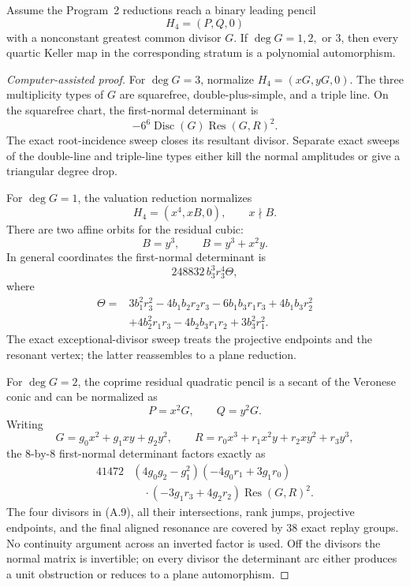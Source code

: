 \begin{theorem}
\label{thm:quartic-binary-fixed-factors}
Assume the Program~2 reductions reach a binary leading pencil
\[
 H_4=(P,Q,0)
\]
with a nonconstant greatest common divisor \(G\).  If
\(\deg G=1,2,\) or \(3\), then every quartic Keller map in the corresponding
stratum is a polynomial automorphism.
\end{theorem}

\begin{proof}[Computer-assisted proof]
For \(\deg G=3\), normalize \(H_4=(xG,yG,0)\).  The three multiplicity
types of \(G\) are squarefree, double-plus-simple, and a triple line.  On
the squarefree chart, the first-normal determinant is
\[
 -6^6\operatorname{Disc}(G)\operatorname{Res}(G,R)^2.
\]
The exact root-incidence sweep closes its resultant divisor.  Separate
exact sweeps of the double-line and triple-line types either kill the normal
amplitudes or give a triangular degree drop.

For \(\deg G=1\), the valuation reduction normalizes
\[
 H_4=(x^4,xB,0),\qquad x\nmid B.
\]
There are two affine orbits for the residual cubic:
\[
 B=y^3,\qquad B=y^3+x^2y.
\]
In general coordinates the first-normal determinant is
\[
 248832\,b_3^3r_3^4\Theta,
\]
where
\[
\begin{aligned}
\Theta={}&3b_1^2r_3^2-4b_1b_2r_2r_3-6b_1b_3r_1r_3
+4b_1b_3r_2^2\\
&+4b_2^2r_1r_3-4b_2b_3r_1r_2+3b_3^2r_1^2.
\end{aligned}
\]
The exact exceptional-divisor sweep treats the projective endpoints and
the resonant vertex; the latter reassembles to a plane reduction.

For \(\deg G=2\), the coprime residual quadratic pencil is a secant of the
Veronese conic and can be normalized as
\[
 P=x^2G,\qquad Q=y^2G.
\]
Writing
\[
 G=g_0x^2+g_1xy+g_2y^2,\qquad
 R=r_0x^3+r_1x^2y+r_2xy^2+r_3y^3,
\]
the \(8\)-by-\(8\) first-normal determinant factors exactly as
\begin{equation}
\begin{aligned}
41472&(4g_0g_2-g_1^2)
(-4g_0r_1+3g_1r_0)\\
&\quad\cdot(-3g_1r_3+4g_2r_2)
\operatorname{Res}(G,R)^2.
\end{aligned}
\tag{A.9}
\end{equation}
The four divisors in (A.9), all their intersections, rank jumps,
projective endpoints, and the final aligned resonance are covered by 38
exact replay groups.  No continuity argument across an inverted factor is
used.  Off the divisors the normal matrix is invertible; on every divisor
the determinant arc either produces a unit obstruction or reduces to a
plane automorphism.
\end{proof}

